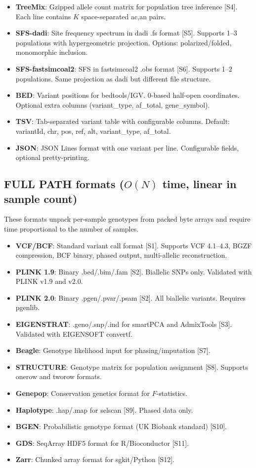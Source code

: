 \documentclass[11pt,a4paper]{article}
\begin{document}
\begin{itemize}
\item \textbf{TreeMix}: Gzipped allele count matrix for population tree inference [S4]. Each line contains $K$ space-separated ac,an pairs.
\item \textbf{SFS-dadi}: Site frequency spectrum in dadi .fs format [S5]. Supports 1--3 populations with hypergeometric projection. Options: polarized/folded, monomorphic inclusion.
\item \textbf{SFS-fastsimcoal2}: SFS in fastsimcoal2 .obs format [S6]. Supports 1--2 populations. Same projection as dadi but different file structure.
\item \textbf{BED}: Variant positions for bedtools/IGV. 0-based half-open coordinates. Optional extra columns (variant\_type, af\_total, gene\_symbol).
\item \textbf{TSV}: Tab-separated variant table with configurable columns. Default: variantId, chr, pos, ref, alt, variant\_type, af\_total.
\item \textbf{JSON}: JSON Lines format with one variant per line. Configurable fields, optional pretty-printing.
\end{itemize}

\subsection*{FULL PATH formats ($O(N)$ time, linear in sample count)}

These formats unpack per-sample genotypes from packed byte arrays and require time proportional to the number of samples.

\begin{itemize}
\item \textbf{VCF/BCF}: Standard variant call format [S1]. Supports VCF 4.1--4.3, BGZF compression, BCF binary, phased output, multi-allelic reconstruction.
\item \textbf{PLINK 1.9}: Binary .bed/.bim/.fam [S2]. Biallelic SNPs only. Validated with PLINK v1.9 and v2.0.
\item \textbf{PLINK 2.0}: Binary .pgen/.pvar/.psam [S2]. All biallelic variants. Requires pgenlib.
\item \textbf{EIGENSTRAT}: .geno/.snp/.ind for smartPCA and AdmixTools [S3]. Validated with EIGENSOFT convertf.
\item \textbf{Beagle}: Genotype likelihood input for phasing/imputation [S7].
\item \textbf{STRUCTURE}: Genotype matrix for population assignment [S8]. Supports onerow and tworow formats.
\item \textbf{Genepop}: Conservation genetics format for $F$-statistics.
\item \textbf{Haplotype}: .hap/.map for selscan [S9]. Phased data only.
\item \textbf{BGEN}: Probabilistic genotype format (UK Biobank standard) [S10].
\item \textbf{GDS}: SeqArray HDF5 format for R/Bioconductor [S11].
\item \textbf{Zarr}: Chunked array format for sgkit/Python [S12].
\end{itemize}
\end{document}
